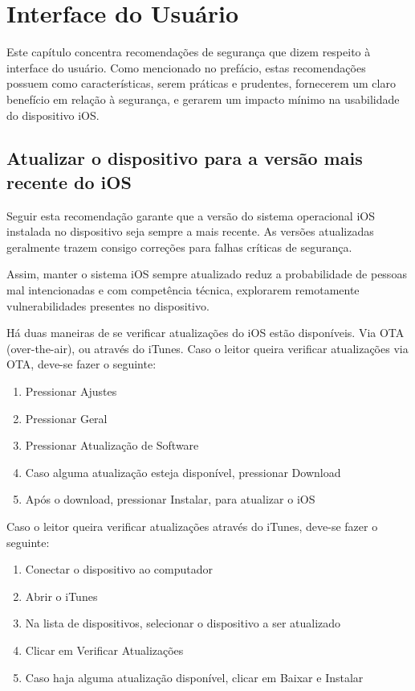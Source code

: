\chapter{Interface do Usu\'ario}

Este cap\'itulo concentra recomenda\c c\~oes de seguran\c ca que dizem respeito \`a interface do usu\'ario. Como mencionado no pref\'acio, estas recomenda\c c\~oes possuem como caracter\'isticas, serem pr\'aticas e prudentes, fornecerem um claro benef\'icio em rela\c c\~ao \`a seguran\c ca, e gerarem um impacto m\'inimo na usabilidade do dispositivo iOS.

\section{Atualizar o dispositivo para a vers\~ao mais recente do iOS}

Seguir esta recomenda\c c\~ao garante que a vers\~ao do sistema operacional iOS instalada no dispositivo seja sempre a mais recente. As vers\~oes atualizadas geralmente trazem consigo corre\c c\~oes para falhas cr\'iticas de seguran\c ca. 

Assim, manter o sistema iOS sempre atualizado reduz a probabilidade de pessoas mal intencionadas e com compet\^encia t\'ecnica, explorarem remotamente vulnerabilidades presentes no dispositivo. 

H\'a duas maneiras de se verificar atualiza\c c\~oes do iOS est\~ao dispon\'iveis. Via OTA (over-the-air), ou atrav\'es do iTunes. Caso o leitor queira verificar atualiza\c c\~oes via OTA, deve-se fazer o seguinte: 

\begin{enumerate}
\item Pressionar Ajustes
\item Pressionar Geral
\item Pressionar Atualiza\c c\~ao de Software
\item Caso alguma atualiza\c c\~ao esteja dispon\'ivel, pressionar Download
\item Ap\'os o download, pressionar Instalar, para atualizar o iOS
\end{enumerate}

Caso o leitor queira verificar atualiza\c c\~oes atrav\'es do iTunes, deve-se fazer o seguinte:

\begin{enumerate}
\item Conectar o dispositivo ao computador
\item Abrir o iTunes
\item Na lista de dispositivos, selecionar o dispositivo a ser atualizado
\item Clicar em Verificar Atualiza\c c\~oes
\item Caso haja alguma atualiza\c c\~ao dispon\'ivel, clicar em Baixar e Instalar
\end{enumerate}

